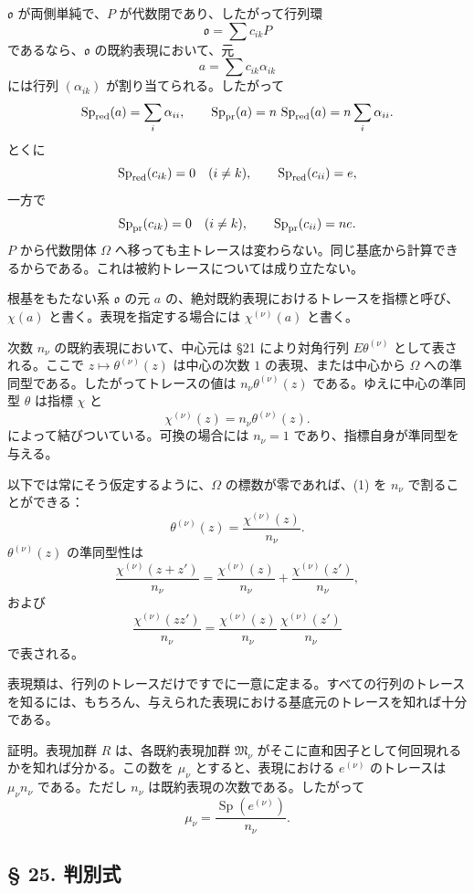 \documentclass[11pt]{article}
\providecommand{\mM}{\mathfrak{M}}
\providecommand{\mo}{\mathfrak{o}}
\begin{document}
$\mo$ が両側単純で、$P$ が代数閉であり、したがって行列環
\[
        \mo=\sum c_{ik}P
\]
であるなら、$\mo$ の既約表現において、元
\[
        a=\sum c_{ik}\alpha_{ik}
\]
には行列 $(\alpha_{ik})$ が割り当てられる。したがって
\[
        \operatorname{Sp}_{\rm red}(a)=\sum_i\alpha_{ii},
        \qquad
        \operatorname{Sp}_{\rm pr}(a)=n\,\operatorname{Sp}_{\rm red}(a)=n\sum_i\alpha_{ii}.
\]
とくに
\[
        \operatorname{Sp}_{\rm red}(c_{ik})=0\quad(i\ne k),\qquad
        \operatorname{Sp}_{\rm red}(c_{ii})=e,
\]
一方で
\[
        \operatorname{Sp}_{\rm pr}(c_{ik})=0\quad(i\ne k),\qquad
        \operatorname{Sp}_{\rm pr}(c_{ii})=n e.
\]
$P$ から代数閉体 $\Omega$ へ移っても主トレースは変わらない。同じ基底から計算できるからである。これは被約トレースについては成り立たない。

根基をもたない系 $\mo$ の元 $a$ の、絶対既約表現におけるトレースを指標と呼び、$\chi(a)$ と書く。表現を指定する場合には $\chi^{(\nu)}(a)$ と書く。

次数 $n_\nu$ の既約表現において、中心元は §21 により対角行列 $E\theta^{(\nu)}$ として表される。ここで $z\mapsto\theta^{(\nu)}(z)$ は中心の次数 $1$ の表現、または中心から $\Omega$ への準同型である。したがってトレースの値は $n_\nu\theta^{(\nu)}(z)$ である。ゆえに中心の準同型 $\theta$ は指標 $\chi$ と
\[
        \chi^{(\nu)}(z)=n_\nu\theta^{(\nu)}(z).              \tag{1}
\]
によって結びついている。可換の場合には $n_\nu=1$ であり、指標自身が準同型を与える。

以下では常にそう仮定するように、$\Omega$ の標数が零であれば、(1) を $n_\nu$ で割ることができる：
\[
        \theta^{(\nu)}(z)=\frac{\chi^{(\nu)}(z)}{n_\nu}.
\]
$\theta^{(\nu)}(z)$ の準同型性は
\[
        \frac{\chi^{(\nu)}(z+z')}{n_\nu}
        =\frac{\chi^{(\nu)}(z)}{n_\nu}
         +\frac{\chi^{(\nu)}(z')}{n_\nu},
\]
および
\[
        \frac{\chi^{(\nu)}(zz')}{n_\nu}
        =\frac{\chi^{(\nu)}(z)}{n_\nu}\,
         \frac{\chi^{(\nu)}(z')}{n_\nu}
\]
で表される。

表現類は、行列のトレースだけですでに一意に定まる。すべての行列のトレースを知るには、もちろん、与えられた表現における基底元のトレースを知れば十分である。

証明。表現加群 $R$ は、各既約表現加群 $\mM_\nu$ がそこに直和因子として何回現れるかを知れば分かる。この数を $\mu_\nu$ とすると、表現における $e^{(\nu)}$ のトレースは $\mu_\nu n_\nu$ である。ただし $n_\nu$ は既約表現の次数である。したがって
\[
        \mu_\nu=\frac{\operatorname{Sp}(e^{(\nu)})}{n_\nu}.
\]

\subsection*{§ 25. 判別式}
\end{document}
